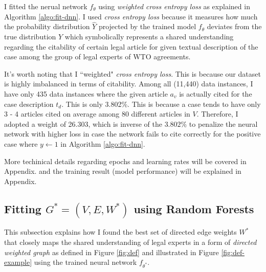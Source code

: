 \documentclass[12pt,letterpaper]{article}
\begin{document}


I fitted the nerual network $f_\theta$ using \textit{weighted cross entropy loss} as explained in Algorithm \ref{algo:fit-dnn}.
I used \textit{cross entropy loss} because it measures how much the probability distribution $\hat{Y}$ projected by the trained model $f_\theta$
deviates from the true distribution $Y$ which symbolically represents a shared understanding regarding the citability of certain legal article for given textual description of the case
among the group of legal experts of WTO agreements.

It's worth noting that I ``weighted" \textit{cross entropy loss}. This is because
our dataset is highly imbalanced in terms of citability.
Among all (11,440) data instances, I have only 435 data instances where the given article $a_v$ is actually cited for the case description $t_d$. This is only 3.802\%.
This is because a case tends to have only 3 - 4 articles cited on average among 80 different articles in $V$.
Therefore, I adopted a weight of 26.303, which is inverse of the $3.802\%$ to penalize the neural network with higher loss in case the network fails to cite correctly for the positive case where $y \gets 1$ in Algorithm \ref{algo:fit-dnn}.

More techinical details regarding epochs and learning rates will be covered in Appendix. and the training result (model performance) will be explained in Appendix.


\subsection{Fitting $G^* = (V, E, W^*)$ using Random Forests}
This subsection explains how I found the best set of directed edge weights $W^*$ that closely maps the shared understanding of legal experts in a form of \textit{directed weighted graph} as defined in Figure \ref{fig:def} and illustrated in Figure \ref{fig:def-example} using the trained neural network $f_{\theta^*}$.
\end{document}
